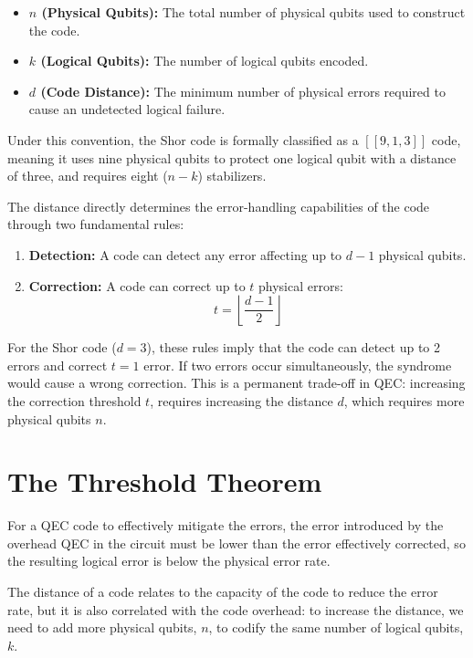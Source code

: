 \begin{itemize}
    \item \textbf{$n$ (Physical Qubits):} The total number of physical qubits used to construct the code.
    \item \textbf{$k$ (Logical Qubits):} The number of logical qubits encoded.
    \item \textbf{$d$ (Code Distance):} The minimum number of physical errors required to cause an undetected logical failure.
\end{itemize}

Under this convention, the Shor code is formally classified as a $[[9, 1, 3]]$ code, meaning it uses nine physical qubits to protect one logical qubit with a distance of three, and requires eight ($n-k$) stabilizers.

The distance directly determines the error-handling capabilities of the code through two fundamental rules:

\begin{enumerate}
    \item \textbf{Detection:} A code can detect any error affecting up to $d-1$ physical qubits.
    \item \textbf{Correction:} A code can correct up to $t$ physical errors:
    \begin{equation}
        t = \left\lfloor \frac{d - 1}{2} \right\rfloor
    \end{equation}
\end{enumerate}

For the Shor code ($d=3$), these rules imply that the code can detect up to 2 errors and correct $t=1$ error. If two errors occur simultaneously, the syndrome would cause a wrong correction. This is a permanent trade-off in QEC: increasing the correction threshold $t$, requires increasing the distance $d$, which requires more physical qubits $n$.

\section{The Threshold Theorem}
For a QEC code to effectively mitigate the errors, the error introduced by the overhead QEC in the circuit must be lower than the error effectively corrected, so the resulting logical error is below the physical error rate.

The distance of a code relates to the capacity of the code to reduce the error rate, but it is also correlated with the code overhead: to increase the distance, we need to add more physical qubits, $n$, to codify the same number of logical qubits, $k$.

